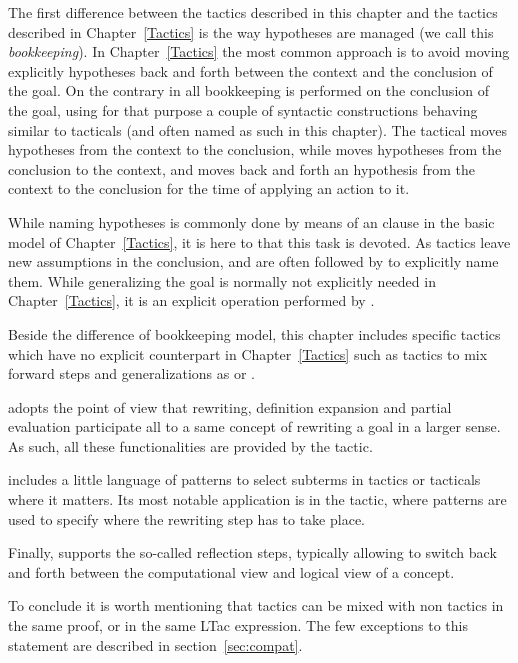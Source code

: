 The first difference between the tactics described in this
chapter and the tactics described in Chapter~\ref{Tactics} is the way
hypotheses are managed (we call this \emph{bookkeeping}).
In Chapter~\ref{Tactics} the most common
approach is to avoid moving explicitly hypotheses back and forth
between the context and the conclusion of the goal. On the contrary
in \ssr{}
all bookkeeping is performed on the conclusion of the goal, using for
that purpose a couple of syntactic constructions behaving similar to
tacticals (and often named as such in this chapter).
The \ssrC{:} tactical  moves hypotheses from the context to the
conclusion, while \ssrC{=>} moves hypotheses from the
conclusion to the context, and  moves back
and forth an hypothesis from the context to the conclusion for the
time of applying an action to it.

While naming hypotheses is commonly done by means of an 
clause in the basic model of Chapter~\ref{Tactics}, it is here to
\ssrC{=>} that this task is devoted. As tactics leave
new assumptions in the conclusion, and are often followed by
\ssrC{=>} to explicitly name them.
While generalizing the goal is normally
not explicitly needed in Chapter~\ref{Tactics}, it is an explicit
operation performed by \ssrC{:}.

Beside the difference of bookkeeping model, this chapter includes
specific tactics which have no explicit counterpart in
Chapter~\ref{Tactics} such as tactics to mix forward steps and
generalizations as  or .

\ssr{} adopts the point of view that rewriting, definition
expansion and partial evaluation participate all to a same concept of
rewriting a goal in a larger sense. As such, all these functionalities are
provided by the  tactic.

\ssrC{} includes a little language of patterns to select subterms in tactics
or tacticals where it matters.  Its most notable application
is in the  tactic, where patterns are used to specify
where the rewriting step has to take place.

Finally, \ssr{} supports the so-called reflection steps, typically
allowing to switch back and forth between the computational view and
logical view of a concept.

To conclude it is worth mentioning that \ssr{} tactics
can be mixed with non \ssr{} tactics in the same proof,
or in the same LTac expression.  The few exceptions
to this statement are described in section~\ref{sec:compat}.

